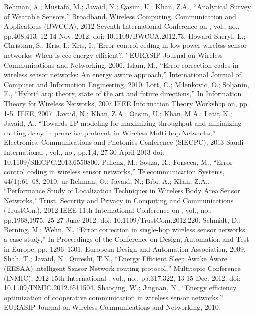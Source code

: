 \documentclass{sig-alternate}
\begin{document}
\begin{thebibliography}{1}
Rehman, A.; Mustafa, M.; Javaid, N.; Qasim, U.; Khan, Z.A., ``Analytical Survey of Wearable Sensors,'' Broadband, Wireless Computing, Communication and Applications (BWCCA), 2012 Seventh International Conference on , vol., no., pp.408,413, 12-14 Nov. 2012. doi: 10.1109/BWCCA.2012.73.
Howard Sheryl, L.; Christian, S.; Kris, I.; Kris, I.,``Error control coding in low-power wireless sensor networks: When is ecc energy-efficient?,'' EURASIP Journal on Wireless Communications and Networking, 2006.
Islam, M., ``Error correction codes in wireless sensor networks: An energy aware approach,'' International Journal of Computer and Information Engineering, 2010.
Lott, C.; Milenkovic, O.; Soljanin, E., ``Hybrid arq: theory, state of the art and future directions,'' In Information Theory for Wireless Networks, 2007 IEEE Information Theory Workshop on, pp. 1-5. IEEE, 2007.
Javaid, N.; Khan, Z.A.; Qasim, U.; Khan, M.A.; Latif, K.; Javaid, A., ``Towards LP modeling for maximizing throughput and minimizing routing delay in proactive protocols in Wireless Multi-hop Networks,'' Electronics, Communications and Photonics Conference (SIECPC), 2013 Saudi International , vol., no., pp.1,4, 27-30 April 2013 doi: 10.1109/SIECPC.2013.6550800.
Pellenz, M.; Souza, R.; Fonseca, M., ``Error control coding in wireless sensor networks,'' Telecommunication Systems, 44(1):61–68, 2010.
ur Rehman, O.; Javaid, N.; Bibi, A.; Khan, Z.A., ``Performance Study of Localization Techniques in Wireless Body Area Sensor Networks,'' Trust, Security and Privacy in Computing and Communications (TrustCom), 2012 IEEE 11th International Conference on , vol., no., pp.1968,1975, 25-27 June 2012. doi: 10.1109/TrustCom.2012.220.
Schmidt, D.; Berning, M.; Wehn, N., ``Error correction in single-hop wireless sensor networks: a case study,'' In Proceedings of the Conference on Design, Automation and Test in Europe, pp. 1296–1301, European Design and Automation Association, 2009.
Shah, T.; Javaid, N.; Qureshi, T.N., ``Energy Efficient Sleep Awake Aware (EESAA) intelligent Sensor Network routing protocol,'' Multitopic Conference (INMIC), 2012 15th International , vol., no., pp.317,322, 13-15 Dec. 2012. doi: 10.1109/INMIC.2012.6511504.
Shaoqing, W.; Jingnan, N., ``Energy efficiency optimization of cooperative communication in wireless sensor networks,'' EURASIP Journal on Wireless Communications and Networking, 2010.

\end{thebibliography}
\end{document}
